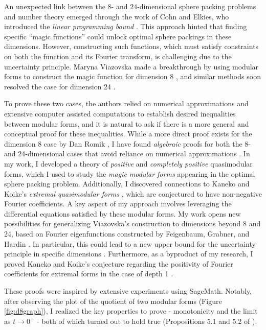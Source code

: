 \documentclass[12pt]{article}
\begin{document}
An unexpected link between the $8$- and $24$-dimensional sphere packing problems and number theory emerged through the work of Cohn and Elkies, who introduced the \emph{linear programming bound} \cite{cohn2003new}. 
This approach hinted that finding specific ``magic functions'' could unlock optimal sphere packings in these dimensions.
However, constructing such functions, which must satisfy constraints on both the function and its Fourier transform, is challenging due to the uncertainty principle.
Maryna Viazovska made a breakthrough by using modular forms to construct the magic function for dimension 8 \cite{viazovska2017sphere}, and similar methods soon resolved the case for dimension 24 \cite{cohn2017sphere}.

To prove these two cases, the authors \cite{viazovska2017sphere,cohn2017sphere} relied on numerical approximations and extensive computer assisted computations to establish desired inequalities between modular forms, and it is natural to ask if there is a more general and conceptual proof for these inequalities.
While a more direct proof exists for the dimension 8 case by Dan Romik \cite{romik2023viazovska}, I have found \emph{algebraic} proofs for both the 8- and 24-dimensional cases that avoid reliance on numerical approximations \cite{lee2024algebraic}.
In my work, I developed a theory of \emph{positive} and \emph{completely positive} quasimodular forms, which I used to study the \emph{magic modular forms} appearing in the optimal sphere packing problem. 
Additionally, I discovered connections to Kaneko and Koike's \emph{extremal quasimodular forms} \cite{kaneko2006extremal}, which are conjectured to have non-negative Fourier coefficients.
A key aspect of my approach involves leveraging the differential equations satisfied by these modular forms.
My work opens new possibilities for generalizing Viazovska's construction to dimensions beyond 8 and 24, based on Fourier eigenfunctions constructed by Feigenbaum, Grabner, and Hardin \cite{feigenbaum2021eigenfunctions}.
In particular, this could lead to a new upper bound for the uncertainty principle in specific dimensions \cite{bourgain2010principe}.
Furthermore, as a byproduct of my research, I proved Kaneko and Koike's conjecture regarding the positivity of Fourier coefficients for extremal forms in the case of depth 1 \cite{kaneko2006extremal}.

These proofs were inspired by extensive experiments using SageMath. 
Notably, after observing the plot of the quotient of two modular forms (Figure \ref{fig:d8graph}), I realized the key properties to prove - monotonicity and the limit as $t \to 0^+$ - both of which turned out to hold true (Propositions 5.1 and 5.2 of \cite{lee2024algebraic}).
\end{document}
